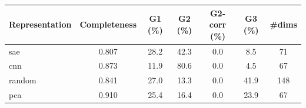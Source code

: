 \begin{tabular}{lcccccc}
\toprule
Representation & Completeness & G1 (\%) & G2 (\%) & G2-corr (\%) & G3 (\%) & \#dims \\
\midrule
sae & 0.807 & 28.2 & 42.3 & 0.0 & 8.5 & 71 \\
cnn & 0.873 & 11.9 & 80.6 & 0.0 & 4.5 & 67 \\
random & 0.841 & 27.0 & 13.3 & 0.0 & 41.9 & 148 \\
pca & 0.910 & 25.4 & 16.4 & 0.0 & 23.9 & 67 \\
\bottomrule
\end{tabular}